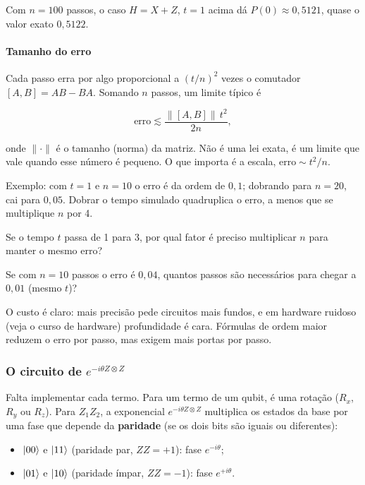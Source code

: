 Com \(n = 100\) passos, o caso \(H = X+Z\), \(t=1\) acima dá \(P(0)\approx 0{,}5121\), quase o valor exato \(0{,}5122\).

\paragraph{Tamanho do erro}\label{tamanho-do-erro}

Cada passo erra por algo proporcional a \((t/n)^2\) vezes o comutador \([A,B] = AB - BA\). Somando \(n\) passos, um limite típico é

\[
\text{erro} \lesssim \frac{\lVert [A,B]\rVert\, t^2}{2n},
\]

onde \(\lVert\cdot\rVert\) é o tamanho (norma) da matriz. Não é uma lei exata, é um limite que vale quando esse número é pequeno. O que importa é a escala, \(\text{erro} \sim t^2/n\).

Exemplo: com \(t = 1\) e \(n = 10\) o erro é da ordem de \(0{,}1\); dobrando para \(n=20\), cai para \(0{,}05\). Dobrar o tempo simulado quadruplica o erro, a menos que se multiplique \(n\) por 4.

Se o tempo \(t\) passa de 1 para 3, por qual fator é preciso multiplicar \(n\) para manter o mesmo erro?

Se com \(n = 10\) passos o erro é \(0{,}04\), quantos passos são necessários para chegar a \(0{,}01\) (mesmo \(t\))?

O custo é claro: mais precisão pede circuitos mais fundos, e em hardware ruidoso (veja o curso de hardware) profundidade é cara. Fórmulas de ordem maior reduzem o erro por passo, mas exigem mais portas por passo.

\subsubsection{\texorpdfstring{O circuito de \(e^{-i\theta Z\otimes Z}\)}{O circuito de e\^{}\{-i\textbackslash theta Z\textbackslash otimes Z\}}}\label{o-circuito-de-e-itheta-zotimes-z}

Falta implementar cada termo. Para um termo de um qubit, é uma rotação (\(R_x\), \(R_y\) ou \(R_z\)). Para \(Z_1Z_2\), a exponencial \(e^{-i\theta Z\otimes Z}\) multiplica os estados da base por uma fase que depende da \textbf{paridade} (se os dois bits são iguais ou diferentes):

\begin{itemize}
\tightlist
\item
  \(\left|{00}\right>\) e \(\left|{11}\right>\) (paridade par, \(ZZ=+1\)): fase \(e^{-i\theta}\);
\item
  \(\left|{01}\right>\) e \(\left|{10}\right>\) (paridade ímpar, \(ZZ=-1\)): fase \(e^{+i\theta}\).
\end{itemize}


